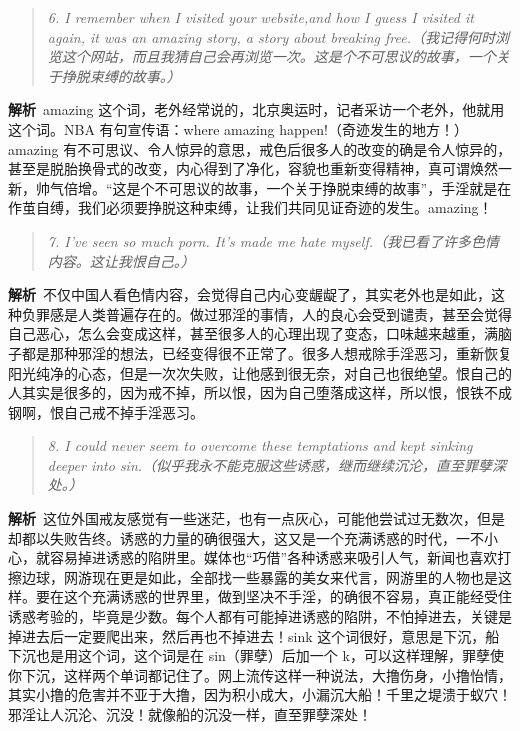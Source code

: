 \begin{quote}\it
    6. I remember when I visited your website,and how I guess I visited it again, it was an amazing story, a story about breaking free.（我记得何时浏览这个网站，而且我猜自己会再浏览一次。这是个不可思议的故事，一个关于挣脱束缚的故事。）
\end{quote}

\textbf{解析}\ amazing 这个词，老外经常说的，北京奥运时，记者采访一个老外，他就用这个词。NBA 有句宣传语：where amazing happen!（奇迹发生的地方！）amazing 有不可思议、令人惊异的意思，戒色后很多人的改变的确是令人惊异的，甚至是脱胎换骨式的改变，内心得到了净化，容貌也重新变得精神，真可谓焕然一新，帅气倍增。“这是个不可思议的故事，一个关于挣脱束缚的故事”，手淫就是在作茧自缚，我们必须要挣脱这种束缚，让我们共同见证奇迹的发生。amazing！

\begin{quote}\it
    7. I've seen so much porn. It's made me hate myself.（我已看了许多色情内容。这让我恨自己。）
\end{quote}

\textbf{解析}\ 不仅中国人看色情内容，会觉得自己内心变龌龊了，其实老外也是如此，这种负罪感是人类普遍存在的。做过邪淫的事情，人的良心会受到谴责，甚至会觉得自己恶心，怎么会变成这样，甚至很多人的心理出现了变态，口味越来越重，满脑子都是那种邪淫的想法，已经变得很不正常了。很多人想戒除手淫恶习，重新恢复阳光纯净的心态，但是一次次失败，让他感到很无奈，对自己也很绝望。恨自己的人其实是很多的，因为戒不掉，所以恨，因为自己堕落成这样，所以恨，恨铁不成钢啊，恨自己戒不掉手淫恶习。

\begin{quote}\it
    8. I could never seem to overcome these temptations and kept sinking deeper into sin.（似乎我永不能克服这些诱惑，继而继续沉沦，直至罪孽深处。）
\end{quote}

\textbf{解析}\ 这位外国戒友感觉有一些迷茫，也有一点灰心，可能他尝试过无数次，但是却都以失败告终。诱惑的力量的确很强大，这又是一个充满诱惑的时代，一不小心，就容易掉进诱惑的陷阱里。媒体也“巧借”各种诱惑来吸引人气，新闻也喜欢打擦边球，网游现在更是如此，全部找一些暴露的美女来代言，网游里的人物也是这样。要在这个充满诱惑的世界里，做到坚决不手淫，的确很不容易，真正能经受住诱惑考验的，毕竟是少数。每个人都有可能掉进诱惑的陷阱，不怕掉进去，关键是掉进去后一定要爬出来，然后再也不掉进去！sink 这个词很好，意思是下沉，船下沉也是用这个词，这个词是在 sin（罪孽）后加一个 k，可以这样理解，罪孽使你下沉，这样两个单词都记住了。网上流传这样一种说法，大撸伤身，小撸怡情，其实小撸的危害并不亚于大撸，因为积小成大，小漏沉大船！千里之堤溃于蚁穴！邪淫让人沉沦、沉没！就像船的沉没一样，直至罪孽深处！

